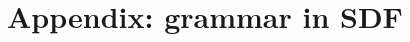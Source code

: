 \documentclass[a4paper]{article}
\begin{document}
\begin{comment}
\inferrule*[right=Call]{
\Lambda(f) = \langle \Gamma', \Lambda', \lambda x_1,...,x_n\; S\rangle\\
1 \leq i \leq n \\
\Gamma, \Lambda \vdash_E e_i \rightarrow v_i\\
\Gamma[x_1/v_1]...[x_n/v_n],\Lambda, \beta \vdash_S S \rightarrow s
}{
\Gamma, \Lambda, \beta \vdash_M f_n(e_1,...,e_n) \rightarrow  s
}
\end{mathpar}
\caption{Semantics of markup forms\label{SEM:markup}}
\end{semantics}

\end{comment}

\newpage
\section*{Appendix: grammar in SDF}
\label{SECT:sdfgrammar}
\end{document}
